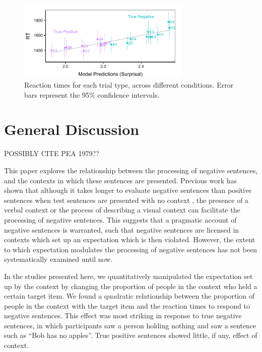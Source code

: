 \documentclass[10pt,letterpaper]{article}
\begin{document}
\begin{figure}
\begin{center} 
\includegraphics[width=3.25in]{figures/model2_comparison.pdf}
\caption{\label{fig:addition_subs} Reaction times for each trial type, across different conditions.  Error bars represent the 95\% confidence intervals.}
\end{center} 
\end{figure}


\section{General Discussion}
POSSIBLY CITE PEA 1979??


This paper explores the relationship between the processing of negative sentences, and the contexts in which these sentences are presented.  Previous work has shown that although it takes longer to evaluate negative sentences than positive sentences when test sentences are presented with no context \cite{carpenter1975, just1971, just1976, hclark1972}, the presence of a verbal context \cite{dale2011, glenberg1999, ludtke2006} or the process of describing a visual context \cite{wason1965} can facilitate the processing of negative sentences.  This suggests that a pragmatic account of negative sentences is warranted, such that negative sentences are licensed in contexts which set up an expectation which is then violated.  However, the extent to which expectation modulates the processing of negative sentences has not been systematically examined until now.  

In the studies presented here, we quantitatively manipulated the expectation set up by the context by changing the proportion of people in the context who held a certain target item.  We found a quadratic relationship between the proportion of people in the context with the target item and the reaction times to respond to negative sentences.  This effect was most striking in response to true negative sentences, in which participants saw a person holding nothing and saw a sentence such as ``Bob has no apples''.  True positive sentences showed little, if any, effect of context.  
\end{document}
